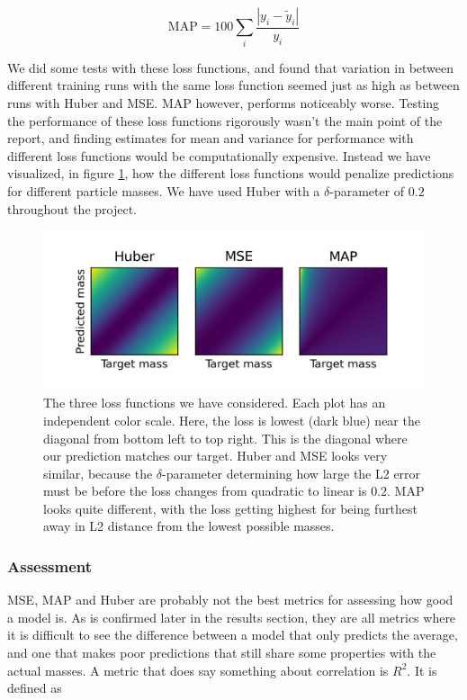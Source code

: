 \documentclass[a4paper]{article}
\begin{document}
\begin{equation}
    \label{eq:MAP}
    \mathrm{MAP} = 100 \sum_i \frac{\left| y_i - \tilde{y}_i \right|}{y_i}
\end{equation}

We did some tests with these loss functions, and found that variation in between different training runs with the same loss function seemed just as high as between runs with Huber and MSE. MAP however, performs noticeably worse. Testing the performance of these loss functions rigorously wasn't the main point of the report, and finding estimates for mean and variance for performance with different loss functions would be computationally expensive. Instead we have visualized, in figure \ref{fig:loss-visualisation}, how the different loss functions would penalize predictions for different particle masses. We have used Huber with a $\delta$-parameter of $0.2$ throughout the project.

\begin{figure}
    \centering
    \includegraphics{Figures/loss_visualisation.png}
    \caption{The three loss functions we have considered. Each plot has an independent color scale. Here, the loss is lowest (dark blue) near the diagonal from bottom left to top right. This is the diagonal where our prediction matches our target. Huber and MSE looks very similar, because the $\delta$-parameter determining how large the L2 error must be before the loss changes from quadratic to linear is $0.2$. MAP looks quite different, with the loss getting highest for being furthest away in L2 distance from the lowest possible masses.}
    \label{fig:loss-visualisation}
\end{figure}

\subsubsection{Assessment}

MSE, MAP and Huber are probably not the best metrics for assessing how good a model is. As is confirmed later in the results section, they are all metrics where it is difficult to see the difference between a model that only predicts the average, and one that makes poor predictions that still share some properties with the actual masses. A metric that does say something about correlation is $R^2$. It is defined as
\end{document}
